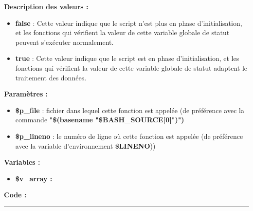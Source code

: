 \documentclass[a4paper,10pt]{article}
\begin{document}
\begin{justify}
    \textbf{Description des valeurs :}

    \begin{itemize}
        \item \textbf{false} : Cette valeur indique que le script n'est plus en phase d'initialisation, et les fonctions qui vérifient la valeur de cette variable globale de statut peuvent s'exécuter normalement.\\

        \item \textbf{true} : Cette valeur indique que le script est en phase d'initialisation, et les fonctions qui vérifient la valeur de cette variable globale de statut adaptent le traitement des données.
    \end{itemize}

\end{justify}


\begin{justify}
    \textbf{Paramètres :}

    \begin{itemize}
        \item \color{orange}\textbf{\$p\_file}\color{white} : fichier dans lequel cette fonction est appelée (de préférence avec la commande \textbf{"\$(\color{gray}basename \color{white}"\color{orange}\$BASH\_SOURCE[0]\color{white}")")}\\

        \item \color{orange}\textbf{\$p\_lineno}\color{white} : le numéro de ligne où cette fonction est appelée (de préférence avec la variable d'environnement \textbf{\color{orange}\$LINENO}))
    \end{itemize}
\end{justify}

\begin{justify}
    \textbf{Variables :}

    \begin{itemize}
        \item \textbf{\color{orange}\$v\_array\color{white} :}
    \end{itemize}
\end{justify}

\begin{justify}
    \textbf{Code :}
\end{justify}



\color{blue}\par\noindent\rule{\textwidth}{0.4pt}\color{white}
\end{document}
